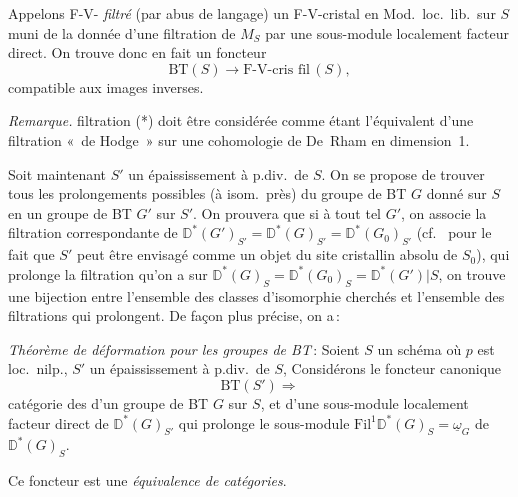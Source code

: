 \documentclass[11pt,a4paper]{article}
\begin{document}

Appelons F-V- \emph{ filtré}  (par abus de langage) un F-V-cristal en Mod.\ loc.\ lib.\ sur $S$ muni  de la donnée d'une filtration de $M_S$ par une sous-module localement facteur direct. On trouve donc en fait un foncteur
\[
  \mathrm{BT}(S) \longrightarrow \text{F-V-cris fil}\,(S) ,
\]
compatible aux images inverses.

\emph{Remarque.}  filtration (*) doit être considérée comme étant l'équivalent d'une filtration «~de Hodge~» sur une cohomologie de De~Rham  en dimension~1.  

Soit maintenant $S'$ un épaississement à p.div.\ de $S$. On se propose de trouver tous les prolongements possibles (à isom.\ près) du groupe de BT $G$ donné sur $S$ en un groupe de BT $G'$ sur $S'$. On  prouvera que si à tout tel $G'$, on associe la filtration correspondante de $\mathbb{D}^*(G')_{S'} = \mathbb{D}^*(G)_{S'} = \mathbb{D}^*(G_0)_{S'}$ (cf.\  pour le fait que $S'$ peut être envisagé comme un objet du site cristallin absolu de $S_0$), qui prolonge la filtration qu'on a sur $\mathbb{D}^*(G)_S = \mathbb{D}^*(G_0)_S = \mathbb{D}^*(G')|S$, on trouve une bijection entre l'ensemble des classes d'isomorphie cherchés et l'ensemble des filtrations qui prolongent. De façon plus précise, on a\,: 

\emph{Théorème de déformation pour les groupes de BT}\,: Soient $S$ un schéma où $p$ est loc.\ nilp., $S'$ un épaississement à p.div.\ de $S$, Considérons le foncteur canonique
\[
  \mathrm{BT}(S') \Longrightarrow
\]
catégorie des   d'un groupe de BT $G$ sur $S$, et d'une sous-module localement facteur direct de $\mathbb{D}^*(G)_{S'}$ qui prolonge le sous-module $\mathrm{Fil}^1\mathbb{D}^*(G)_S = \underline{\omega}_G$ de $\mathbb{D}^*(G)_S$.

Ce foncteur est une \emph{équivalence de catégories}. 
\end{document}
